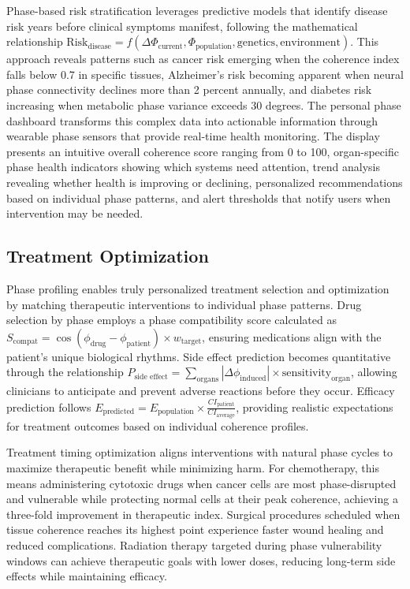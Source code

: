 \documentclass[12pt,a4paper]{report}
\begin{document}
Phase-based risk stratification leverages predictive models that identify disease risk years before clinical symptoms manifest, following the mathematical relationship $\text{Risk}_{\text{disease}} = f(\Delta\Phi_{\text{current}}, \Phi_{\text{population}}, \text{genetics}, \text{environment})$. This approach reveals patterns such as cancer risk emerging when the coherence index falls below 0.7 in specific tissues, Alzheimer's risk becoming apparent when neural phase connectivity declines more than 2 percent annually, and diabetes risk increasing when metabolic phase variance exceeds 30 degrees. The personal phase dashboard transforms this complex data into actionable information through wearable phase sensors that provide real-time health monitoring. The display presents an intuitive overall coherence score ranging from 0 to 100, organ-specific phase health indicators showing which systems need attention, trend analysis revealing whether health is improving or declining, personalized recommendations based on individual phase patterns, and alert thresholds that notify users when intervention may be needed.

\subsection{Treatment Optimization}

Phase profiling enables truly personalized treatment selection and optimization by matching therapeutic interventions to individual phase patterns. Drug selection by phase employs a phase compatibility score calculated as $S_{\text{compat}} = \cos(\phi_{\text{drug}} - \phi_{\text{patient}}) \times w_{\text{target}}$, ensuring medications align with the patient's unique biological rhythms. Side effect prediction becomes quantitative through the relationship $P_{\text{side effect}} = \sum_{\text{organs}} |\Delta\phi_{\text{induced}}| \times \text{sensitivity}_{\text{organ}}$, allowing clinicians to anticipate and prevent adverse reactions before they occur. Efficacy prediction follows $E_{\text{predicted}} = E_{\text{population}} \times \frac{CI_{\text{patient}}}{CI_{\text{average}}}$, providing realistic expectations for treatment outcomes based on individual coherence profiles.

Treatment timing optimization aligns interventions with natural phase cycles to maximize therapeutic benefit while minimizing harm. For chemotherapy, this means administering cytotoxic drugs when cancer cells are most phase-disrupted and vulnerable while protecting normal cells at their peak coherence, achieving a three-fold improvement in therapeutic index. Surgical procedures scheduled when tissue coherence reaches its highest point experience faster wound healing and reduced complications. Radiation therapy targeted during phase vulnerability windows can achieve therapeutic goals with lower doses, reducing long-term side effects while maintaining efficacy.
\end{document}
